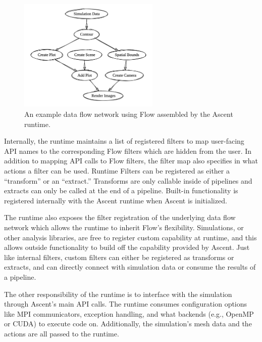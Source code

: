 \begin{figure}
\centering
\includegraphics[width=0.6\textwidth]{images/flow_graph}
\caption{\label{img:flow_graph} An example data flow network using Flow assembled by the Ascent runtime.}
\end{figure}

Internally, the runtime maintains a list of registered filters to map
user-facing API names to the corresponding Flow filters which are hidden
from the user.
%
In addition to mapping API calls to Flow filters, the filter map also specifies
in what actions a filter can be used.
%
Runtime Filters can be registered as either a ``transform'' or an ``extract.''
%
Transforms are only callable inside of pipelines and extracts can only be called at the end of a pipeline.
%
Built-in functionality is registered internally with the Ascent runtime when Ascent is initialized.


The runtime also exposes the filter registration of the underlying data flow network which
allows the runtime to inherit Flow's flexibility.
%
Simulations, or other analysis libraries, are free to register custom capability at
runtime, and this allows outside functionality to build off the capability
provided by Ascent.
%
Just like internal filters, custom filters can either be registered as transforms or extracts,
and can directly connect with simulation data or consume the results of a pipeline.
%

The other responsibility of the runtime is to interface with the simulation through Ascent's
main API calls.
%
The runtime consumes configuration options like MPI communicators, exception
handling, and what
backends (e.g., OpenMP or CUDA) to execute code on.
%
Additionally, the simulation's mesh data and the actions are all passed to the runtime.

